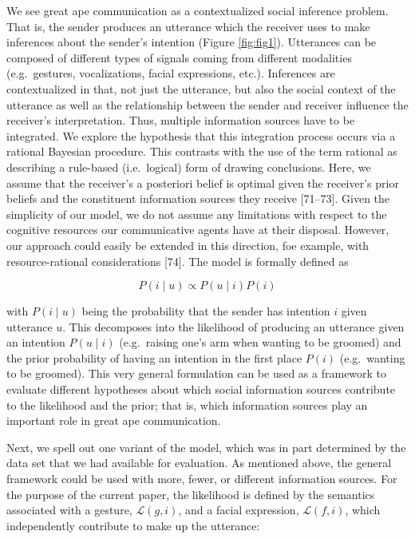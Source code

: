 \documentclass[
  man,floatsintext]{apa6}
\begin{document}
We see great ape communication as a contextualized social inference problem. That is, the sender produces an utterance which the receiver uses to make inferences about the sender's intention (Figure \ref{fig:fig1}). Utterances can be composed of different types of signals coming from different modalities (e.g.~gestures, vocalizations, facial expressions, etc.). Inferences are contextualized in that, not just the utterance, but also the social context of the utterance as well as the relationship between the sender and receiver influence the receiver's interpretation. Thus, multiple information sources have to be integrated. We explore the hypothesis that this integration process occurs via a rational Bayesian procedure. This contrasts with the use of the term rational as describing a rule-based (i.e.~logical) form of drawing conclusions. Here, we assume that the receiver's a posteriori belief is optimal given the receiver's prior beliefs and the constituent information sources they receive {[}71--73{]}. Given the simplicity of our model, we do not assume any limitations with respect to the cognitive resources our communicative agents have at their disposal. However, our approach could easily be extended in this direction, foe example, with resource-rational considerations {[}74{]}. The model is formally defined as

\begin{equation}
P(i \mid u)\propto P(u \mid i) P(i)
\end{equation}

with \(P(i \mid u)\) being the probability that the sender has intention \(i\) given utterance \(u\). This decomposes into the likelihood of producing an utterance given an intention \(P(u \mid i)\) (e.g.~raising one's arm when wanting to be groomed) and the prior probability of having an intention in the first place \(P(i)\) (e.g.~wanting to be groomed). This very general formulation can be used as a framework to evaluate different hypotheses about which social information sources contribute to the likelihood and the prior; that is, which information sources play an important role in great ape communication.

Next, we spell out one variant of the model, which was in part determined by the data set that we had available for evaluation. As mentioned above, the general framework could be used with more, fewer, or different information sources. For the purpose of the current paper, the likelihood is defined by the semantics associated with a gesture, \(\mathcal{L}(g,i)\), and a facial expression, \(\mathcal{L}(f,i)\), which independently contribute to make up the utterance:
\end{document}
